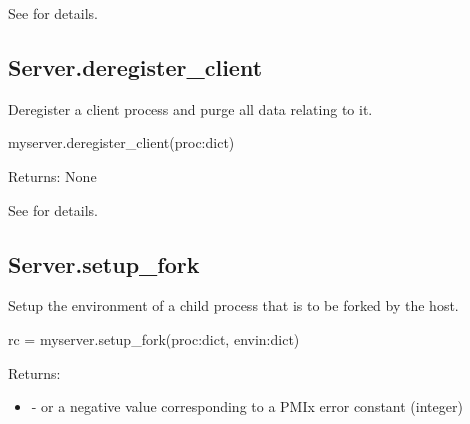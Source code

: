 See  for details.


\subsection{Server.deregister_client}

\summary
Deregister a client process and purge all data relating to it.


\format

\pyspecificstart
\begin{codepar}
myserver.deregister_client(proc:dict)
\end{codepar}
\pyspecificend


\begin{arglist}
\end{arglist}

Returns: None

See  for details.


\subsection{Server.setup_fork}

\summary
Setup the environment of a child process that is to be forked
by the host.

\format

\pyspecificstart
\begin{codepar}
rc = myserver.setup_fork(proc:dict, envin:dict)
\end{codepar}
\pyspecificend


\begin{arglist}
\end{arglist}

Returns:

\begin{itemize}
    \item {} -  or a negative value corresponding to a PMIx error constant (integer)
\end{itemize}

